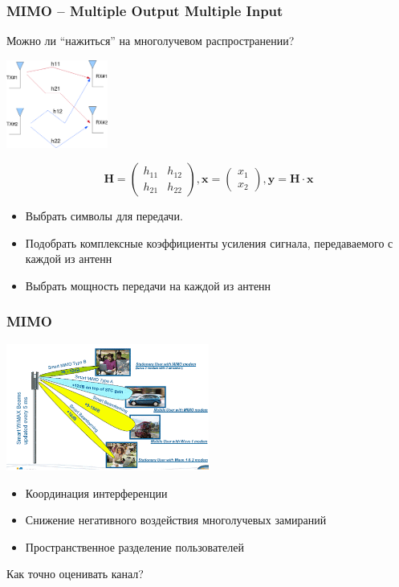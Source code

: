 \documentclass[utf8]{beamer}
\begin{document}
\begin{frame}
\frametitle{MIMO -- Multiple Output Multiple Input}
Можно ли ``нажиться'' на многолучевом распространении?
\begin{center}
\includegraphics[width=0.25\textwidth]{pic/2tx_2rx_mimo.png}
\end{center}
$$
\mathbf{H} =
\left(
\begin{array}{cc}
h_{11} & h_{12} \\
h_{21} & h_{22}
\end{array}
\right),
\mathbf{x} =
\left(
\begin{array}{c}
x_{1} \\ x_{2}
\end{array}
\right),
\mathbf{y} = \mathbf{H}\cdot \mathbf{x}
$$
\begin{itemize}
	\item Выбрать символы для передачи.
	\item Подобрать комплексные коэффициенты усиления сигнала, передаваемого с каждой из антенн
	\item Выбрать мощность передачи на каждой из антенн
\end{itemize}
\end{frame}
\begin{frame}
\frametitle{MIMO}
\begin{center}
\includegraphics[width=0.5\textwidth]{pic/MAS_gains.png}
\end{center}
\begin{itemize}
	\item Координация интерференции
	\item Снижение негативного воздействия многолучевых замираний
	\item Пространственное разделение пользователей
\end{itemize}
Как точно оценивать канал?
\end{frame}
\end{document}
